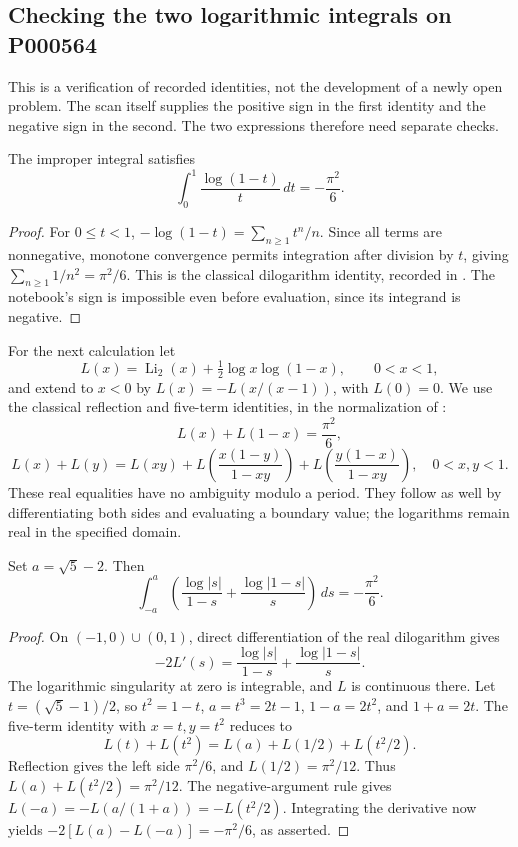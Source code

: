 \subsection{Checking the two logarithmic integrals on P000564}
This is a verification of recorded identities, not the development of a newly open problem. The scan itself supplies the positive sign in the first identity and the negative sign in the second. The two expressions therefore need separate checks.

\begin{proposition}\ours
The improper integral satisfies
\[
 \int_0^1\frac{\log(1-t)}{t}\,dt=-\frac{\pi^2}{6}.
\]
\end{proposition}
\begin{proof}
For \(0\le t<1\), \(-\log(1-t)=\sum_{n\ge1}t^n/n\). Since all terms are nonnegative, monotone convergence permits integration after division by \(t\), giving \(\sum_{n\ge1}1/n^2=\pi^2/6\). This is the classical dilogarithm identity, recorded in \citet[Eqs.~25.12.1--2]{nist2026polylogarithms}. The notebook's sign is impossible even before evaluation, since its integrand is negative.
\end{proof}

For the next calculation let
\[
 L(x)=\operatorname{Li}_2(x)+\tfrac12\log x\log(1-x),\qquad0<x<1,
\]
and extend to \(x<0\) by \(L(x)=-L(x/(x-1))\), with \(L(0)=0\). We use the classical reflection and five-term identities, in the normalization of \citet[Chapter II, \S1.A, pp.~23--24]{zagier2007dilogarithm}:
\[
 L(x)+L(1-x)=\frac{\pi^2}{6},
\]
\[
 L(x)+L(y)=L(xy)+L\!\left(\frac{x(1-y)}{1-xy}\right)
                    +L\!\left(\frac{y(1-x)}{1-xy}\right),\quad0<x,y<1.
\]
These real equalities have no ambiguity modulo a period. They follow as well by differentiating both sides and evaluating a boundary value; the logarithms remain real in the specified domain.

\begin{proposition}\ours
Set \(a=\sqrt5-2\). Then
\[
 \int_{-a}^{a}\left(\frac{\log|s|}{1-s}
                   +\frac{\log|1-s|}{s}\right)\,ds=-\frac{\pi^2}{6}.
\]
\end{proposition}
\begin{proof}
On \((-1,0)\cup(0,1)\), direct differentiation of the real dilogarithm gives
\[
 -2L'(s)=\frac{\log|s|}{1-s}+\frac{\log|1-s|}{s}.
\]
The logarithmic singularity at zero is integrable, and \(L\) is continuous there. Let \(t=(\sqrt5-1)/2\), so \(t^2=1-t\), \(a=t^3=2t-1\), \(1-a=2t^2\), and \(1+a=2t\). The five-term identity with \(x=t,y=t^2\) reduces to
\[
 L(t)+L(t^2)=L(a)+L(1/2)+L(t^2/2).
\]
Reflection gives the left side \(\pi^2/6\), and \(L(1/2)=\pi^2/12\). Thus \(L(a)+L(t^2/2)=\pi^2/12\). The negative-argument rule gives
\(L(-a)=-L(a/(1+a))=-L(t^2/2)\). Integrating the derivative now yields
\(-2[L(a)-L(-a)]=-\pi^2/6\), as asserted.
\end{proof}

